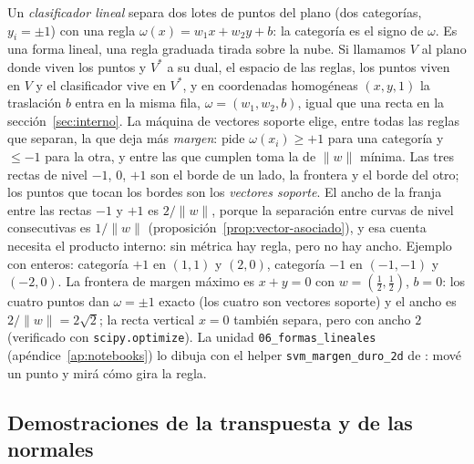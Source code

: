 
\begin{idea}
Un \emph{clasificador lineal} separa dos lotes de puntos del plano (dos categorías,
\(y_i=\pm1\)) con una regla \(\omega(x)=w_1x+w_2y+b\): la categoría es el signo de \(\omega\).
Es una forma lineal, una regla graduada tirada sobre la nube. Si llamamos \(V\) al plano donde
viven los puntos y \(V^{*}\) a su dual, el espacio de las reglas, los puntos viven en \(V\) y el
clasificador vive en \(V^{*}\), y en coordenadas homogéneas \((x,y,1)\) la traslación \(b\)
entra en la misma fila, \(\omega=(w_1,w_2,b)\), igual que una recta en la
sección~\ref{sec:interno}. La máquina de vectores soporte elige, entre todas las reglas
que separan, la que deja más \emph{margen}: pide \(\omega(x_i)\ge+1\) para una categoría y
\(\le-1\) para la otra, y entre las que cumplen toma la de \(\|w\|\) mínima. Las tres
rectas de nivel \(-1\), \(0\), \(+1\) son el borde de un lado, la frontera y el borde del
otro; los puntos que tocan los bordes son los \emph{vectores soporte}. El ancho de la
franja entre las rectas \(-1\) y \(+1\) es \(2/\|w\|\), porque la separación entre curvas de
nivel consecutivas es \(1/\|w\|\) (proposición~\ref{prop:vector-asociado}), y esa cuenta
necesita el producto interno: sin métrica hay regla, pero no hay ancho. Ejemplo con enteros:
categoría \(+1\) en \((1,1)\) y \((2,0)\),
categoría \(-1\) en \((-1,-1)\) y \((-2,0)\). La frontera de margen máximo es \(x+y=0\) con
\(w=(\tfrac12,\tfrac12)\), \(b=0\): los cuatro puntos dan \(\omega=\pm1\) exacto (los cuatro
son vectores soporte) y el ancho es \(2/\|w\|=2\sqrt2\); la recta vertical \(x=0\) también
separa, pero con ancho \(2\) (verificado con \texttt{scipy.optimize}). La unidad
\texttt{06\_formas\_lineales}
(apéndice~\ref{ap:notebooks}) lo dibuja con el helper \texttt{svm\_margen\_duro\_2d} de
: mové un punto y mirá cómo gira la regla.
\end{idea}

\subsection{Demostraciones de la transpuesta y de las normales}\label{sec:demos-transpuesta}

